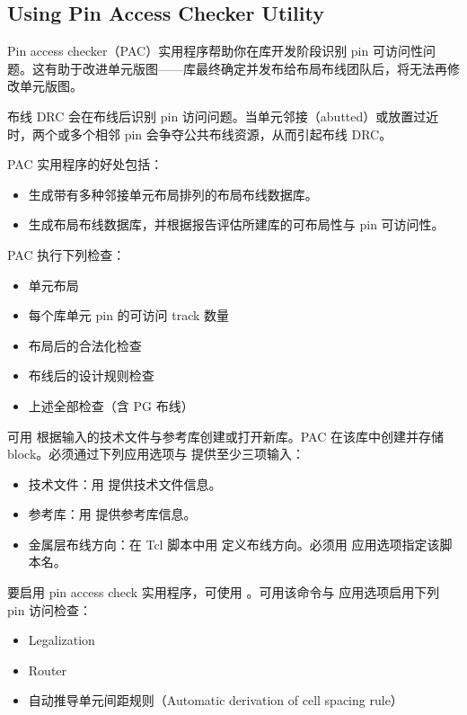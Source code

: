 \subsection*{Using Pin Access Checker Utility}

Pin access checker（PAC）实用程序帮助你在库开发阶段识别 pin 可访问性问题。这有助于改进单元版图——库最终确定并发布给布局布线团队后，将无法再修改单元版图。

布线 DRC 会在布线后识别 pin 访问问题。当单元邻接（abutted）或放置过近时，两个或多个相邻 pin 会争夺公共布线资源，从而引起布线 DRC。

PAC 实用程序的好处包括：
\begin{itemize}
  \item 生成带有多种邻接单元布局排列的布局布线数据库。
  \item 生成布局布线数据库，并根据报告评估所建库的可布局性与 pin 可访问性。
\end{itemize}

PAC 执行下列检查：
\begin{itemize}
  \item 单元布局
  \item 每个库单元 pin 的可访问 track 数量
  \item 布局后的合法化检查
  \item 布线后的设计规则检查
  \item 上述全部检查（含 PG 布线）
\end{itemize}

可用  根据输入的技术文件与参考库创建或打开新库。PAC 在该库中创建并存储 block。必须通过下列应用选项与  提供至少三项输入：
\begin{itemize}
  \item 技术文件：用  提供技术文件信息。
  \item 参考库：用  提供参考库信息。
  \item 金属层布线方向：在 Tcl 脚本中用  定义布线方向。必须用  应用选项指定该脚本名。
\end{itemize}

要启用 pin access check 实用程序，可使用 。可用该命令与  应用选项启用下列 pin 访问检查：
\begin{itemize}
  \item Legalization
  \item Router
  \item 自动推导单元间距规则（Automatic derivation of cell spacing rule）
\end{itemize}

